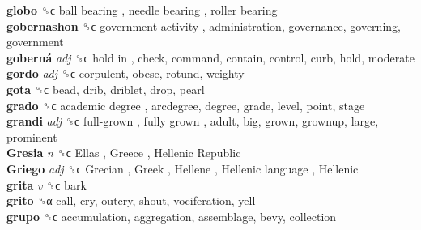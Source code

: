 \textbf{globo} ␝ϲ   ball bearing ,  needle bearing ,  roller bearing   \\
\textbf{gobernashon} ␝ϲ   government activity , administration, governance, governing, government  \\
\textbf{goberná} \emph{adj}  ␝ϲ   hold in , check, command, contain, control, curb, hold, moderate  \\
\textbf{gordo} \emph{adj}  ␝ϲ  corpulent, obese, rotund, weighty  \\
\textbf{gota} ␝ϲ  bead, drib, driblet, drop, pearl  \\
\textbf{grado} ␝ϲ   academic degree , arcdegree, degree, grade, level, point, stage  \\
\textbf{grandi} \emph{adj}  ␝ϲ   full-grown ,  fully grown , adult, big, grown, grownup, large, prominent  \\
\textbf{Gresia} \emph{n}  ␝ϲ   Ellas ,  Greece ,  Hellenic Republic   \\
\textbf{Griego} \emph{adj}  ␝ϲ   Grecian ,  Greek ,  Hellene ,  Hellenic language ,  Hellenic   \\
\textbf{grita} \emph{v}  ␝ϲ  bark  \\
\textbf{grito} ␝α  call, cry, outcry, shout, vociferation, yell  \\
\textbf{grupo} ␝ϲ  accumulation, aggregation, assemblage, bevy, collection  \\
